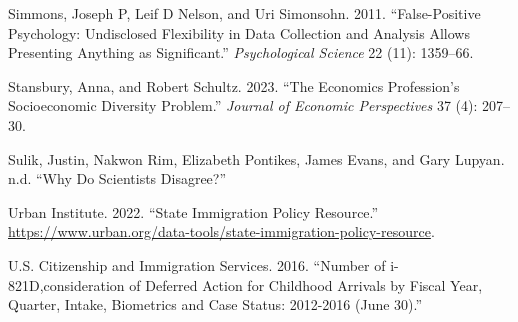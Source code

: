 \documentclass[
  letterpaper,
  DIV=11,
  numbers=noendperiod]{scrartcl}
\newlength{\cslhangindent}
\newlength{\cslentryspacingunit} %
\newenvironment{CSLReferences}[2] %
 {%
  \setlength{\parindent}{0pt}
  \ifodd #1
  \let\oldpar\par
  \def\par{\hangindent=\cslhangindent\oldpar}
  \fi
  \setlength{\parskip}{#2\cslentryspacingunit}
 }%
 {}
\begin{document}
\begin{CSLReferences}{1}{0}
\leavevmode{}%
Simmons, Joseph P, Leif D Nelson, and Uri Simonsohn. 2011.
{``False-Positive Psychology: Undisclosed Flexibility in Data Collection
and Analysis Allows Presenting Anything as Significant.''}
\emph{Psychological Science} 22 (11): 1359--66.

\leavevmode{}%
Stansbury, Anna, and Robert Schultz. 2023. {``The Economics Profession's
Socioeconomic Diversity Problem.''} \emph{Journal of Economic
Perspectives} 37 (4): 207--30.

\leavevmode{}%
Sulik, Justin, Nakwon Rim, Elizabeth Pontikes, James Evans, and Gary
Lupyan. n.d. {``Why Do Scientists Disagree?''}

\leavevmode{}%
Urban Institute. 2022. {``State Immigration Policy Resource.''}
\url{https://www.urban.org/data-tools/state-immigration-policy-resource}.

\leavevmode{}%
U.S. Citizenship and Immigration Services. 2016. {``Number of
i-821D,consideration of Deferred Action for Childhood Arrivals by Fiscal
Year, Quarter, Intake, Biometrics and Case Status: 2012-2016 (June
30).''}

\end{CSLReferences}
\end{document}
